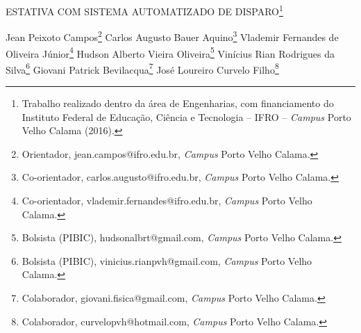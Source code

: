 \documentclass[article,12pt,onesidea,4paper,english,brazil]{abntex2}
\begin{document}
	
	
	\frenchspacing 
	
	\begin{center}
		\LARGE ESTATIVA COM SISTEMA AUTOMATIZADO DE DISPARO\footnote{Trabalho realizado dentro da área de Engenharias, com financiamento do Instituto Federal de Educação, Ciência e Tecnologia – IFRO – \textit{Campus} Porto Velho Calama (2016).}
		
		\normalsize
		Jean Peixoto Campos\footnote{Orientador, jean.campos@ifro.edu.br, \textit{Campus} Porto Velho Calama.} 
		Carlos Augusto Bauer Aquino\footnote{Co-orientador, carlos.augusto@ifro.edu.br, \textit{Campus} Porto Velho Calama.} 
		Vlademir Fernandes de Oliveira Júnior\footnote{Co-orientador, vlademir.fernandes@ifro.edu.br, \textit{Campus} Porto Velho Calama.} 
		Hudson Alberto Vieira Oliveira\footnote{Bolsista (PIBIC), hudsonalbrt@gmail.com, \textit{Campus} Porto Velho Calama.}
		Vinícius Rian Rodrigues da Silva\footnote{Bolsista (PIBIC), vinicius.rianpvh@gmail.com, \textit{Campus} Porto Velho Calama.}
		Giovani Patrick Bevilacqua\footnote{Colaborador, giovani.fisica@gmail.com, \textit{Campus} Porto Velho Calama.}
		José Loureiro Curvelo Filho\footnote{Colaborador, curvelopvh@hotmail.com, \textit{Campus} Porto Velho Calama.} 
	\end{center}
	
\end{document}
